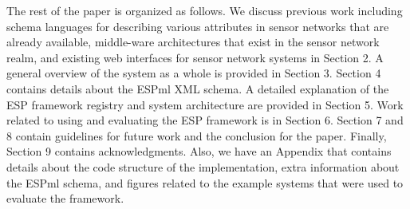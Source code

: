 The rest of the paper is organized as follows.  We discuss previous work including schema languages for describing
various attributes in sensor networks that are already available, middle-ware architectures that exist in the sensor
network realm, and existing web interfaces for sensor network systems in Section 2.  A general overview of the system
as a whole is provided in Section 3.  Section 4 contains details about the ESPml XML schema.  A detailed explanation of the ESP framework
registry and system architecture are provided in Section 5.  Work related to using and evaluating the ESP framework is in Section
6.  Section 7 and 8 contain guidelines for future work and the
conclusion for the paper.  Finally, Section 9 contains acknowledgments.  Also, we have an Appendix that contains
details about the code structure of the implementation, extra information about the ESPml schema, and figures related to the example
systems that were used to evaluate the framework.

